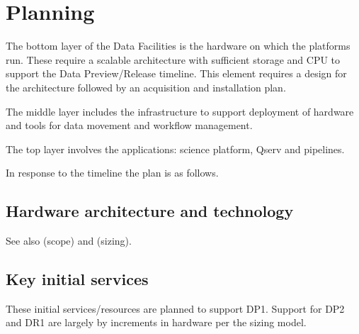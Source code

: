 \section{Planning}\label{sec:plan}

The bottom layer of the Data Facilities is the hardware on which the
platforms run. These require a scalable architecture with sufficient
storage and \gls{CPU} to support the Data Preview/Release timeline.  This
element requires a design for the architecture followed by an
acquisition and installation plan.

The middle layer includes the infrastructure to support deployment of
hardware and tools for data movement and workflow management.

 The top layer involves the applications: science platform, \gls{Qserv} and pipelines.

In response to the timeline  the plan is as follows.

\subsection {Hardware architecture and technology}
See also  (scope) and   (sizing).

\subsection{Key initial services}

These initial services/resources are planned to support \gls{DP1}. Support
for \gls{DP2} and DR1 are largely by increments in hardware per the sizing model.

